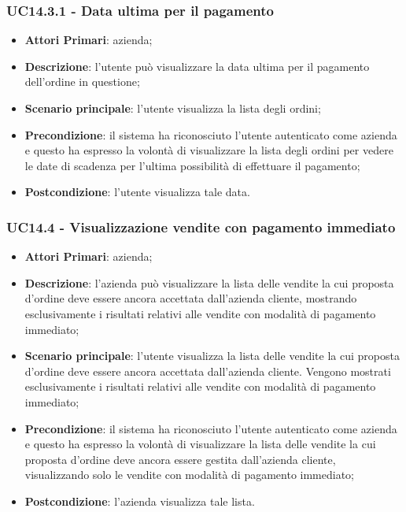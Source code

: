 \subsubsection{UC14.3.1 - Data ultima per il pagamento}
\begin{itemize}
	\item \textbf{Attori Primari}: azienda;
	\item \textbf{Descrizione}: l'utente può visualizzare la data ultima per il pagamento dell'ordine in questione;
	\item \textbf{Scenario principale}: l'utente visualizza la lista degli ordini;
	\item \textbf{Precondizione}: il sistema ha riconosciuto l'utente autenticato come azienda e questo ha espresso la volontà di visualizzare la lista degli ordini per vedere le date di scadenza per l'ultima possibilità di effettuare il pagamento;
	\item \textbf{Postcondizione}: l'utente visualizza tale data.
\end{itemize}

\subsubsection{UC14.4 - Visualizzazione vendite con pagamento immediato}
\begin{itemize}
	\item \textbf{Attori Primari}: azienda;
	\item \textbf{Descrizione}: l'azienda può visualizzare la lista delle vendite la cui proposta d'ordine deve essere ancora accettata dall'azienda cliente, mostrando esclusivamente i risultati relativi alle vendite con modalità di pagamento immediato;
	\item \textbf{Scenario principale}: l'utente visualizza la lista delle vendite la cui proposta d'ordine deve essere ancora accettata dall'azienda cliente. Vengono mostrati esclusivamente i risultati relativi alle vendite con modalità di pagamento immediato;
	\item \textbf{Precondizione}: il sistema ha riconosciuto l'utente autenticato come azienda e questo ha espresso la volontà di visualizzare la lista delle vendite la cui proposta d'ordine deve ancora essere gestita dall'azienda cliente, visualizzando solo le vendite con modalità di pagamento immediato;
	\item \textbf{Postcondizione}: l'azienda visualizza tale lista.
\end{itemize}


